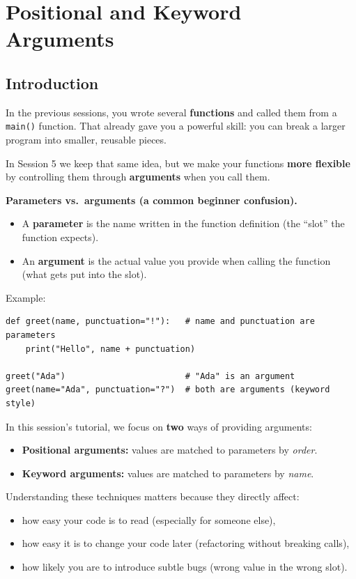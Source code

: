 \chapter{ Positional and Keyword Arguments}


\section{Introduction}
In the previous sessions, you wrote several \textbf{functions} and called them from a \texttt{main()} function.
That already gave you a powerful skill: you can break a larger program into smaller, reusable pieces.

In Session 5 we keep that same idea, but we make your functions \textbf{more flexible} by controlling them through
\textbf{arguments} when you call them.

\noindent
\textbf{Parameters vs.\ arguments (a common beginner confusion).}
\begin{itemize}\setlength{\itemsep}{2pt}
    \item A \textbf{parameter} is the name written in the function definition (the ``slot'' the function expects).
    \item An \textbf{argument} is the actual value you provide when calling the function (what gets put into the slot).
\end{itemize}

\noindent
Example:
\begin{verbatim}
def greet(name, punctuation="!"):   # name and punctuation are parameters
    print("Hello", name + punctuation)

greet("Ada")                        # "Ada" is an argument
greet(name="Ada", punctuation="?")  # both are arguments (keyword style)
\end{verbatim}

\noindent
In this session's tutorial, we focus on \textbf{two} ways of providing arguments:
\begin{itemize}\setlength{\itemsep}{2pt}
    \item \textbf{Positional arguments:} values are matched to parameters by \textit{order}.
    \item \textbf{Keyword arguments:} values are matched to parameters by \textit{name}.
\end{itemize}

Understanding these techniques matters because they directly affect:
\begin{itemize}\setlength{\itemsep}{2pt}
    \item how easy your code is to read (especially for someone else),
    \item how easy it is to change your code later (refactoring without breaking calls),
    \item how likely you are to introduce subtle bugs (wrong value in the wrong slot).
\end{itemize}



